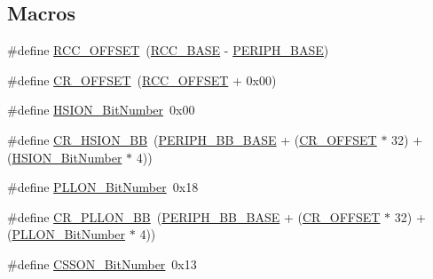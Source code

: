\subsection*{Macros}
\begin{DoxyCompactItemize}
\item 
\#define \hyperlink{group___r_c_c___private___defines_ga539e07c3b3c55f1f1d47231341fb11e1}{R\+C\+C\+\_\+\+O\+F\+F\+S\+ET}~(\hyperlink{openmotestm_2library_2inc_2stm32f10x__map_8h_a0e681b03f364532055d88f63fec0d99d}{R\+C\+C\+\_\+\+B\+A\+SE} -\/ \hyperlink{openmotestm_2library_2inc_2stm32f10x__map_8h_a9171f49478fa86d932f89e78e73b88b0}{P\+E\+R\+I\+P\+H\+\_\+\+B\+A\+SE})
\item 
\#define \hyperlink{group___r_c_c___private___defines_gafa1d3d0ea72132df651c76fc1bdffffc}{C\+R\+\_\+\+O\+F\+F\+S\+ET}~(\hyperlink{openmotestm_2library_2src_2stm32f10x__rcc_8c_a539e07c3b3c55f1f1d47231341fb11e1}{R\+C\+C\+\_\+\+O\+F\+F\+S\+ET} + 0x00)
\item 
\#define \hyperlink{group___r_c_c___private___defines_ga3d3085e491cbef815d223afbe5bf1930}{H\+S\+I\+O\+N\+\_\+\+Bit\+Number}~0x00
\item 
\#define \hyperlink{group___r_c_c___private___defines_gac3290a833c0e35ec17d32c2d494e6133}{C\+R\+\_\+\+H\+S\+I\+O\+N\+\_\+\+BB}~(\hyperlink{openmotestm_2library_2inc_2stm32f10x__map_8h_aed7efc100877000845c236ccdc9e144a}{P\+E\+R\+I\+P\+H\+\_\+\+B\+B\+\_\+\+B\+A\+SE} + (\hyperlink{openmotestm_2library_2src_2stm32f10x__rcc_8c_afa1d3d0ea72132df651c76fc1bdffffc}{C\+R\+\_\+\+O\+F\+F\+S\+ET} $\ast$ 32) + (\hyperlink{openmotestm_2library_2src_2stm32f10x__rcc_8c_a3d3085e491cbef815d223afbe5bf1930}{H\+S\+I\+O\+N\+\_\+\+Bit\+Number} $\ast$ 4))
\item 
\#define \hyperlink{group___r_c_c___private___defines_gab24d7f5f8e4b3b717fd91b54f393f6a3}{P\+L\+L\+O\+N\+\_\+\+Bit\+Number}~0x18
\item 
\#define \hyperlink{group___r_c_c___private___defines_ga3f1fb2589cb8b5ac2f7121aba1135a5f}{C\+R\+\_\+\+P\+L\+L\+O\+N\+\_\+\+BB}~(\hyperlink{openmotestm_2library_2inc_2stm32f10x__map_8h_aed7efc100877000845c236ccdc9e144a}{P\+E\+R\+I\+P\+H\+\_\+\+B\+B\+\_\+\+B\+A\+SE} + (\hyperlink{openmotestm_2library_2src_2stm32f10x__rcc_8c_afa1d3d0ea72132df651c76fc1bdffffc}{C\+R\+\_\+\+O\+F\+F\+S\+ET} $\ast$ 32) + (\hyperlink{openmotestm_2library_2src_2stm32f10x__rcc_8c_ab24d7f5f8e4b3b717fd91b54f393f6a3}{P\+L\+L\+O\+N\+\_\+\+Bit\+Number} $\ast$ 4))
\item 
\#define \hyperlink{group___r_c_c___private___defines_ga253fa44d87aabc55f0cd6628e77a51fd}{C\+S\+S\+O\+N\+\_\+\+Bit\+Number}~0x13

\end{DoxyCompactItemize}

